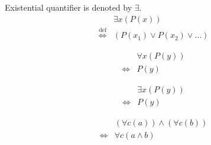 \begin{defn}
Existential quantifier is denoted by $\exists$.
\begin{align*}
& \exists x (P(x)) \\
\overset{\operatorname{def}}{\iff} & (P(x_1) \lor P(x_2) \lor \dots)
\end{align*}
\end{defn}

\begin{axm}
\label{Axiom:forall_independent_variable}
\begin{align*}
& \forall x (P(y)) \\
\iff & P(y)
\end{align*}
\end{axm}

\begin{axm}
\label{Axiom:exists_independent_variable}
\begin{align*}
& \exists x (P(y)) \\
\iff & P(y)
\end{align*}
\end{axm}

\begin{prop}
\label{Proposition:forall_land_commutativity}
\begin{align*}
& (\forall c (a)) \land (\forall c (b)) \\
\iff & \forall c (a \land b)
\end{align*}
\end{prop}

